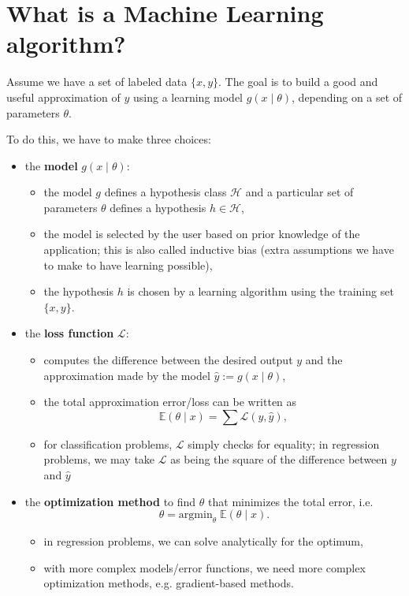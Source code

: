 \documentclass[a4paper,11pt]{report}
\newcommand{\ds}{\displaystyle}
\begin{document}
\section{What is a Machine Learning algorithm?}

Assume we have a set of labeled data $\{x, y \}$. The goal is to build a good and useful approximation of $y$ using a learning model $g(x \mid \theta)$, depending on a set of parameters $\theta$.  

To do this, we have to make three choices:
\begin{itemize}
  \item the \textbf{model} $g(x \mid \theta)$:
    \begin{itemize}
      \item the model $g$ defines a hypothesis class $\mathcal{H}$ and a particular set of parameters $\theta$ defines a hypothesis $h \in \mathcal{H}$,
      \item the model is selected by the user based on prior knowledge of the application; this is also called inductive bias (extra assumptions we have to make to have learning possible),
      \item the hypothesis $h$ is chosen by a learning algorithm using the training set $\{x, y \}$.
    \end{itemize}
  \item the \textbf{loss function} $\mathcal{L}$:
    \begin{itemize}
      \item computes the difference between the desired output $y$ and the approximation made by the model $\hat{y} := g(x \mid \theta)$,
      \item the total approximation error/loss can be written as $$\mathbb{E}(\theta \mid x) = \ds\sum{\mathcal{L}(y, \hat{y})},$$
      \item for classification problems, $\mathcal{L}$ simply checks for equality; in regression problems, we may take $\mathcal{L}$ as being the square of the difference between $y$  and $\hat{y}$
    \end{itemize}
  \item the \textbf{optimization method} to find $\theta$ that minimizes the total error, i.e. $$ \theta = \textrm{argmin}_{\theta}\; \mathbb{E}(\theta \mid x).$$
    \begin{itemize}
      \item in regression problems, we can solve analytically for the optimum, 
      \item with more complex models/error functions, we need more complex optimization methods, e.g. gradient-based methods. 
    \end{itemize}
\end{itemize}
\end{document}
